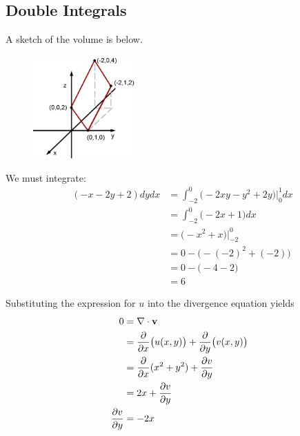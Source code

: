 
\subsection{Double Integrals}

\BEN 
\item %
\BEN
\item A sketch of the volume is below. 
\begin{figure}[h]
  \vspace{-1pt}
  \begin{center}
    \includegraphics[width=0.35\textwidth]{ImgSolid.jpg}
  \end{center}
\end{figure}
\item We must integrate:
\begin{align*}
  \mathop{\int_{-2}^0 \! \int_0^1} (-x-2y+2 ) dydx 
  &= \int_{-2}^0 \big( -2xy -y^2 + 2y \big) \big|_0^1 dx \\
  &= \int_{-2}^0 \Big( -2x + 1  \Big) dx \\
  &= \Big(-x^2 + x \Big) \Big|_{-2}^0  \\  
  &= 0- \big(- (-2)^2 + (-2)\big)\\
  &= 0- \big(- 4 -2\big)\\
  &= 6
\end{align*}
\EEN
\item %
\BEN
\item Substituting the expression for $u$ into the divergence equation yields
\begin{align*}
  0&= \nabla \cdot \mathbf{v} \\
  &= \frac{\partial}{\partial x} \big(u(x,y)\big) + \frac{\partial}{\partial y} \big(v(x,y)\big) \\
  &= \frac{\partial}{\partial x} (x^2 + y^2) + \frac{\partial v}{\partial y}\\
  &= 2x + \frac{\partial v}{\partial y} \\
   \frac{\partial v}{\partial y} &= -2x 
\end{align*}
